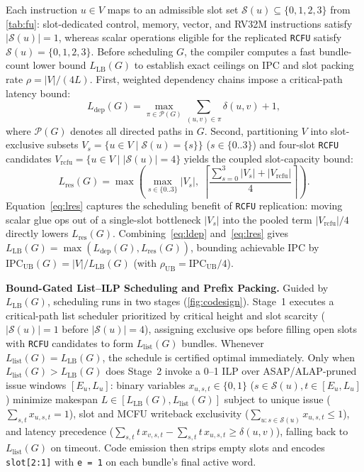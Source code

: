 \documentclass[9pt,conference]{IEEEtran}
\begin{document}
Each instruction $u \in V$ maps to an admissible slot set $\mathcal{S}(u) \subseteq \{0, 1, 2, 3\}$ from \autoref{tab:fu}: slot-dedicated control, memory, vector, and RV32M instructions satisfy $|\mathcal{S}(u)| = 1$, whereas scalar operations eligible for the replicated \texttt{RCFU} satisfy $\mathcal{S}(u) = \{0, 1, 2, 3\}$. Before scheduling $G$, the compiler computes a fast bundle-count lower bound $L_{\mathrm{LB}}(G)$ to establish exact ceilings on IPC and slot packing rate $\rho = |V| / (4L)$. First, weighted dependency chains impose a critical-path latency bound:
\begin{equation}
L_{\mathrm{dep}}(G) = \max_{\pi \in \mathcal{P}(G)} \sum_{(u,v) \in \pi} \delta(u, v) + 1,
\label{eq:ldep}
\end{equation}
where $\mathcal{P}(G)$ denotes all directed paths in $G$. Second, partitioning $V$ into slot-exclusive subsets $V_s = \{u \in V \mid \mathcal{S}(u) = \{s\}\}$ ($s \in \{0..3\}$) and four-slot \texttt{RCFU} candidates $V_{\mathrm{rcfu}} = \{u \in V \mid |\mathcal{S}(u)| = 4\}$ yields the coupled slot-capacity bound:
\begin{equation}
L_{\mathrm{res}}(G) = \max\!\left( \max_{s \in \{0..3\}} |V_s|,\; \left\lceil \frac{\sum_{s=0}^{3} |V_s| + |V_{\mathrm{rcfu}}|}{4} \right\rceil \right).
\label{eq:lres}
\end{equation}
Equation~\eqref{eq:lres} captures the scheduling benefit of \texttt{RCFU} replication: moving scalar glue ops out of a single-slot bottleneck $|V_s|$ into the pooled term $|V_{\mathrm{rcfu}}|/4$ directly lowers $L_{\mathrm{res}}(G)$. Combining~\eqref{eq:ldep} and~\eqref{eq:lres} gives $L_{\mathrm{LB}}(G) = \max(L_{\mathrm{dep}}(G), L_{\mathrm{res}}(G))$, bounding achievable IPC by $\mathrm{IPC}_{\mathrm{UB}}(G) = |V| / L_{\mathrm{LB}}(G)$ (with $\rho_{\mathrm{UB}} = \mathrm{IPC}_{\mathrm{UB}} / 4$).

\textbf{Bound-Gated List--ILP Scheduling and Prefix Packing.}
Guided by $L_{\mathrm{LB}}(G)$, scheduling runs in two stages (\autoref{fig:codesign}). Stage~1 executes a critical-path list scheduler prioritized by critical height and slot scarcity ($|\mathcal{S}(u)| = 1$ before $|\mathcal{S}(u)| = 4$), assigning exclusive ops before filling open slots with \texttt{RCFU} candidates to form $L_{\mathrm{list}}(G)$ bundles. Whenever $L_{\mathrm{list}}(G) = L_{\mathrm{LB}}(G)$, the schedule is certified optimal immediately. Only when $L_{\mathrm{list}}(G) > L_{\mathrm{LB}}(G)$ does Stage~2 invoke a 0--1 ILP over ASAP/ALAP-pruned issue windows $[E_u, L_u]$: binary variables $x_{u,s,t} \in \{0, 1\}$ ($s \in \mathcal{S}(u), t \in [E_u, L_u]$) minimize makespan $L \in [L_{\mathrm{LB}}(G), L_{\mathrm{list}}(G)]$ subject to unique issue ($\sum_{s,t} x_{u,s,t} = 1$), slot and MCFU writeback exclusivity ($\sum_{u:s\in\mathcal{S}(u)} x_{u,s,t} \le 1$), and latency precedence ($\sum_{s,t} t\,x_{v,s,t} - \sum_{s,t} t\,x_{u,s,t} \ge \delta(u,v)$), falling back to $L_{\mathrm{list}}(G)$ on timeout. Code emission then strips empty slots and encodes \texttt{slot[2:1]} with \texttt{e = 1} on each bundle's final active word.
\end{document}
